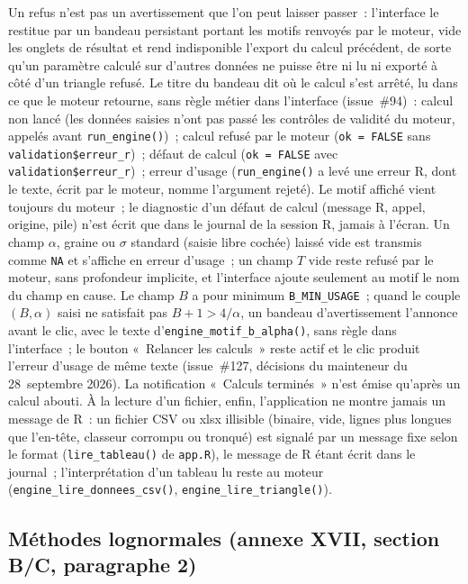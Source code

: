 \documentclass[a4paper,11pt]{article}
\newcommand{\code}[1]{\texttt{\small #1}}
\begin{document}
Un refus n'est pas un avertissement que l'on peut laisser passer~: l'interface le
restitue par un bandeau persistant portant les motifs renvoyés par le moteur,
vide les onglets de résultat et rend indisponible l'export du calcul précédent,
de sorte qu'un paramètre calculé sur d'autres données ne puisse être ni lu ni
exporté à côté d'un triangle refusé. Le titre du bandeau dit où le calcul s'est arrêté, lu dans
ce que le moteur retourne, sans règle métier dans l'interface (issue~\#94)~: calcul non lancé
(les données saisies n'ont pas passé les contrôles de validité du moteur, appelés avant
\code{run\_engine()})~; calcul refusé par le moteur (\code{ok = FALSE} sans
\code{validation\$erreur\_r})~; défaut de calcul (\code{ok = FALSE} avec
\code{validation\$erreur\_r})~; erreur d'usage (\code{run\_engine()} a levé une erreur R, dont le
texte, écrit par le moteur, nomme l'argument rejeté). Le motif affiché vient toujours du
moteur~; le diagnostic d'un défaut de calcul (message R, appel, origine, pile) n'est écrit que
dans le journal de la session R, jamais à l'écran. Un champ $\alpha$, graine ou $\sigma$ standard (saisie libre
cochée) laissé vide est transmis comme \code{NA} et s'affiche en erreur d'usage~; un champ $T$ vide
reste refusé par le moteur, sans profondeur implicite, et l'interface ajoute seulement au motif
le nom du champ en cause. Le champ $B$ a pour minimum \code{B\_MIN\_USAGE}~; quand le couple
$(B, \alpha)$ saisi ne satisfait pas $B + 1 > 4/\alpha$, un bandeau d'avertissement l'annonce
avant le clic, avec le texte d'\code{engine\_motif\_b\_alpha()}, sans règle dans l'interface~; le
bouton «~Relancer les calculs~» reste actif et le clic produit l'erreur d'usage de même texte
(issue~\#127, décisions du mainteneur du 28~septembre 2026). La notification «~Calculs terminés~» n'est émise qu'après un calcul
abouti. À la lecture d'un fichier, enfin, l'application ne montre jamais un message de R~: un
fichier CSV ou xlsx illisible (binaire, vide, lignes plus longues que l'en-tête, classeur
corrompu ou tronqué) est signalé par un message fixe selon le format (\code{lire\_tableau()} de
\code{app.R}), le message de R étant écrit dans le journal~; l'interprétation d'un tableau lu
reste au moteur (\code{engine\_lire\_donnees\_csv()}, \code{engine\_lire\_triangle()}).

\subsection*{Méthodes lognormales (annexe XVII, section B/C, paragraphe 2)}
\end{document}
